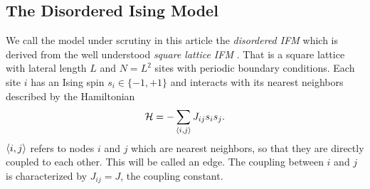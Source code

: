 \subsection{The Disordered Ising Model}
\label{ssec:model}
    We call the model under scrutiny in this article the \emph{disordered IFM}
    which is derived from the well understood \emph{square lattice IFM} \cite{Onsager1944}.
    That is a square lattice with lateral length \(L\) and \(N=L^2\)
    sites with periodic boundary conditions.
    Each site $i$ has an Ising spin \(s_i \in \{-1,+1\}\) and interacts with its
    nearest neighbors described by the Hamiltonian
    \begin{equation}
        \mathcal{H} = - \sum_{\left< i,j \right>}J_{ij}s_{i}s_{j}.
        \label{eq:hamiltonian}
    \end{equation}
    \(\left< i,j \right>\) refers to nodes \(i\) and \(j\) which are nearest
    neighbors, so that they are directly coupled to each other.
    This will be called an edge.
    The coupling between \(i\) and \(j\) is characterized by \(J_{ij} = J\),
    the coupling constant.

